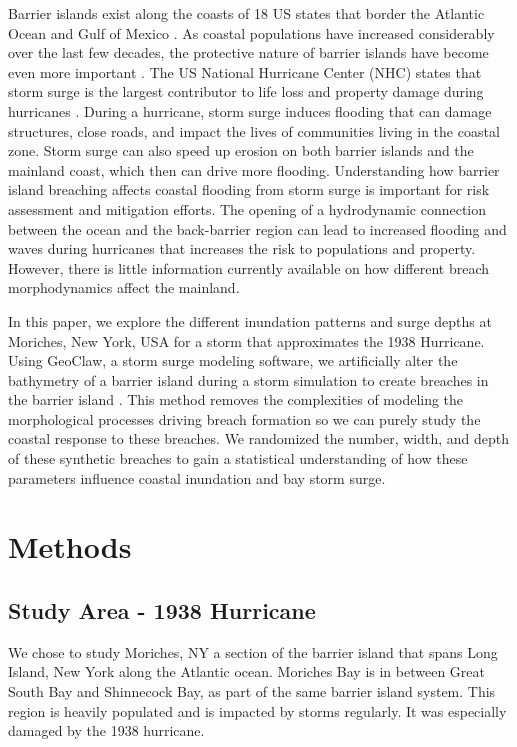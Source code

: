 \documentclass{coastal_paper}
\begin{document}
Barrier islands exist along the coasts of 18 US states that border the Atlantic Ocean and Gulf of Mexico \citep{Zhang2011}. As coastal populations have increased considerably over the last few decades, the protective nature of barrier islands have become even more important \citep{Zhang2011}. The US National Hurricane Center (NHC) states that storm surge  is the largest contributor to life loss and property damage during hurricanes \citep{Center2006}. During a hurricane, storm surge induces flooding that can damage structures, close roads, and impact the lives of communities living in the coastal zone. Storm surge can also speed up erosion on both barrier islands and the mainland coast, which then can drive more flooding. Understanding how barrier island breaching affects coastal flooding from storm surge is important for risk assessment and mitigation efforts. The opening of a hydrodynamic connection between the ocean and the back-barrier region can lead to increased flooding and waves during hurricanes that increases the risk to populations and property. However, there is little information currently available on how different breach morphodynamics affect the mainland.

In this paper, we explore the different inundation patterns and surge depths at Moriches, New York, USA for a storm that approximates the 1938 Hurricane. Using GeoClaw, a storm surge modeling software, we artificially alter the bathymetry of a barrier island during a storm simulation to create breaches in the barrier island \citep{mandli2016clawpack}. This method removes the complexities of modeling the morphological processes driving breach formation so we can purely study the coastal response to these breaches. We randomized the number, width, and depth of these synthetic breaches to gain a statistical understanding of how these parameters influence coastal inundation and bay storm surge. 

\section{Methods}
\subsection{Study Area - 1938 Hurricane}
We chose to study Moriches, NY a section of the barrier island that spans Long Island, New York along the Atlantic ocean. Moriches Bay is in between Great South Bay and Shinnecock Bay, as part of the same barrier island system. This region is heavily populated and is impacted by storms regularly. It was especially damaged by the 1938 hurricane.
\end{document}

